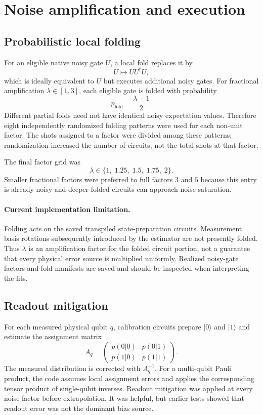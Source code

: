 \documentclass[11pt]{article}
\begin{document}
\section{Noise amplification and execution}

\subsection{Probabilistic local folding}

For an eligible native noisy gate $U$, a local fold replaces it by
\[
  U \longmapsto U U^\dagger U,
\]
which is ideally equivalent to $U$ but executes additional noisy gates.
For fractional amplification $\lambda\in[1,3]$, each eligible gate is folded
with probability
\[
  p_{\mathrm{fold}}=\frac{\lambda-1}{2}.
\]
Different partial folds need not have identical noisy expectation values.
Therefore eight independently randomized folding patterns were used for each
non-unit factor.  The shots assigned to a factor were divided among these
patterns; randomization increased the number of circuits, not the total shots
at that factor.

The final factor grid was
\[
  \lambda\in\{1,\;1.25,\;1.5,\;1.75,\;2\}.
\]
Smaller fractional factors were preferred to full factors $3$ and $5$
because this entry is already noisy and deeper folded circuits can approach
noise saturation.

\paragraph{Current implementation limitation.}
Folding acts on the saved transpiled state-preparation circuits.  Measurement
basis rotations subsequently introduced by the estimator are not presently
folded.  Thus $\lambda$ is an amplification factor for the folded circuit
portion, not a guarantee that every physical error source is multiplied
uniformly.  Realized noisy-gate factors and fold manifests are saved and
should be inspected when interpreting the fits.

\subsection{Readout mitigation}

For each measured physical qubit $q$, calibration circuits prepare
$\lvert0\rangle$ and $\lvert1\rangle$ and estimate the assignment matrix
\[
 A_q =
 \begin{pmatrix}
 p(0|0) & p(0|1)\\
 p(1|0) & p(1|1)
 \end{pmatrix}.
\]
The measured distribution is corrected with $A_q^{-1}$.  For a multi-qubit
Pauli product, the code assumes local assignment errors and applies the
corresponding tensor product of single-qubit inverses.  Readout mitigation was
applied at every noise factor before extrapolation.  It was helpful, but
earlier tests showed that readout error was not the dominant bias source.
\end{document}
